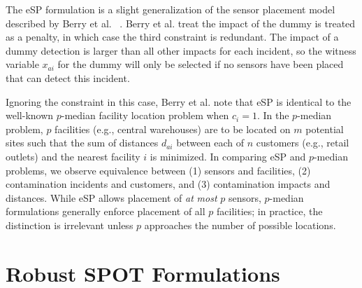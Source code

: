 The eSP formulation is a slight generalization of the sensor placement model described by Berry et al. ~\cite{BerHarPhiUbeWat06}. Berry et al. treat the impact of the dummy is treated as a penalty, in which case the third constraint is redundant. The impact of a dummy detection is larger than all other impacts for each incident, so the witness variable $x_{ai}$ for the dummy will only be selected if no sensors have been placed that can detect this incident.

Ignoring the constraint in this case, Berry et al. note that eSP is identical to the well-\/known $p$-\/median facility location problem \citep{MirFra90} when $c_i=1$. In the $p$-\/median problem, $p$ facilities (e.g., central warehouses) are to be located on $m$ potential sites such that the sum of distances $d_{ai}$ between each of $n$ customers (e.g., retail outlets) and the nearest facility $i$ is minimized. In comparing eSP and $p$-\/median problems, we observe equivalence between (1) sensors and facilities, (2) contamination incidents and customers, and (3) contamination impacts and distances. While eSP allows placement of {\itshape at\/} {\itshape most\/} $p$ sensors, $p$-\/median formulations generally enforce placement of all $p$ facilities; in practice, the distinction is irrelevant unless $p$ approaches the number of possible locations.

\section{Robust SPOT Formulations}\label{formulations_formulationsRobust}

